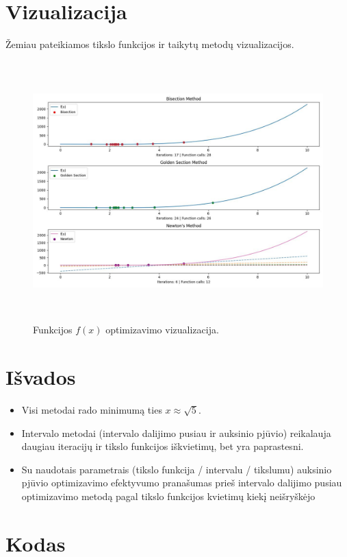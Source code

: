 \documentclass[lithuanian,a4paper,12pt]{article}
\begin{document}
\section{Vizualizacija}
Žemiau pateikiamos tikslo funkcijos ir taikytų metodų vizualizacijos.

\begin{figure}[H]
    \centering
    \includegraphics[width=\textwidth,height=10cm]{figure-1.jpeg}
    \caption{\label{fig:all}Funkcijos $f(x)$ optimizavimo vizualizacija.}
\end{figure}

\section{Išvados}
\begin{itemize}
    \item Visi metodai rado minimumą ties $x \approx \sqrt{5}$.
    \item Intervalo metodai (intervalo dalijimo pusiau ir auksinio pjūvio) reikalauja daugiau iteracijų ir tikslo funkcijos iškvietimų, bet yra paprastesni.
    \item Su naudotais parametrais (tikslo funkcija / intervalu / tikslumu) auksinio pjūvio optimizavimo efektyvumo pranašumas prieš intervalo dalijimo pusiau optimizavimo metodą pagal tikslo funkcijos kvietimų kiekį neišryškėjo
\end{itemize}

\section{Kodas}

\end{document}
